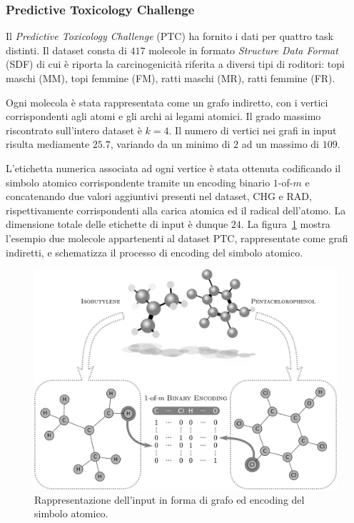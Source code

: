 \subsubsection*{Predictive Toxicology Challenge}\label{sec:esperimenti:dataset:ptc}
Il \emph{Predictive Toxicology Challenge} (PTC) \cite{Helma:ThePTC} ha fornito i dati per quattro task distinti. Il dataset consta di $417$ molecole in formato \emph{Structure Data Format} (SDF) di cui è riporta la carcinogenicità riferita a diversi tipi di roditori: topi maschi (MM), topi femmine (FM), ratti maschi (MR), ratti femmine (FR). 

Ogni molecola è stata rappresentata come un grafo indiretto, con i vertici corrispondenti agli atomi e gli archi ai legami atomici. Il grado massimo riscontrato sull'intero dataset è $k = 4$. Il numero di vertici nei grafi in input risulta mediamente $25.7$, variando da un minimo di $2$ ad un massimo di $109$.

L'etichetta numerica associata ad ogni vertice è stata ottenuta codificando il simbolo atomico corrispondente tramite un encoding binario $1$-of-$m$ e concatenando due valori aggiuntivi presenti nel dataset, CHG e RAD, rispettivamente corrispondenti alla carica atomica ed il radical dell'atomo. La dimensione totale delle etichette di input è dunque $24$. 
La figura~\ref{fig:molecole} mostra l'esempio due molecole appartenenti al dataset PTC, rappresentate come grafi indiretti, e schematizza il processo di encoding del simbolo atomico.
\begin{figure}[tbp]
\centering
\includegraphics[width=0.9\columnwidth]{img/molecole-v2}
\medskip
\caption[Rappresentazione dell'input]{Rappresentazione dell'input in forma di grafo ed encoding del simbolo atomico.}
\label{fig:molecole}
\end{figure}

